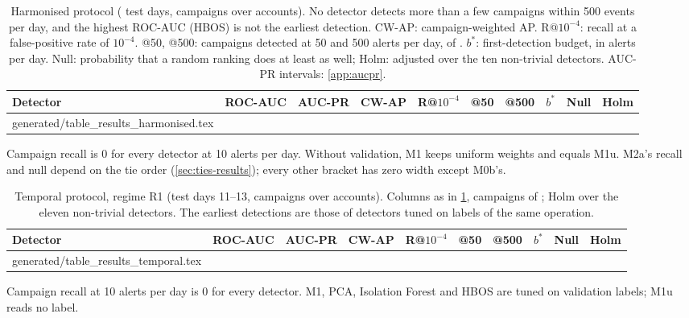 \documentclass[11pt,a4paper]{article}
\makeatletter
\newcommand{\tablerows}[1]{\@@input #1 }
\makeatother
\begin{document}
\begin{table}[t]
\centering
\scriptsize
\begin{threeparttable}
\caption{Harmonised protocol (\HarmTestDays{} test days, \HarmTestCampaigns{} campaigns over \HarmTestAccounts{} accounts). No detector detects more than a few campaigns within 500 events per day, and the highest ROC-AUC (HBOS) is not the earliest detection. CW-AP: campaign-weighted AP. R@$10^{-4}$: recall at a false-positive rate of $10^{-4}$. @50, @500: campaigns detected at 50 and 500 alerts per day, of \HarmTestCampaigns{}. $b^{*}$: first-detection budget, in alerts per day. Null: probability that a random ranking does at least as well; Holm: adjusted over the ten non-trivial detectors. AUC-PR intervals: \cref{app:aucpr}.}
\label{tab:results-harmonised}
\setlength{\tabcolsep}{3pt}
\begin{tabular}{@{}lrlllrrrrr@{}}
\toprule
Detector & ROC-AUC & AUC-PR & CW-AP & R@$10^{-4}$ & @50 & @500 & $b^{*}$ & Null & Holm \\
\midrule
\tablerows{generated/table_results_harmonised.tex}
\bottomrule
\end{tabular}
\begin{tablenotes}\footnotesize
\item Campaign recall is 0 for every detector at 10 alerts per day. Without validation, M1 keeps uniform weights and equals M1u. M2a's recall and null depend on the tie order (\cref{sec:ties-results}); every other bracket has zero width except M0b's.
\end{tablenotes}
\end{threeparttable}
\end{table}

\begin{table}[t]
\centering
\scriptsize
\begin{threeparttable}
\caption{Temporal protocol, regime R1 (test days 11--13, \TempTestCampaigns{} campaigns over \TempTestAccounts{} accounts). Columns as in \cref{tab:results-harmonised}, campaigns of \TempTestCampaigns{}; Holm over the eleven non-trivial detectors. The earliest detections are those of detectors tuned on labels of the same operation.}
\label{tab:results-temporal}
\setlength{\tabcolsep}{3pt}
\begin{tabular}{@{}lrlllrrrrr@{}}
\toprule
Detector & ROC-AUC & AUC-PR & CW-AP & R@$10^{-4}$ & @50 & @500 & $b^{*}$ & Null & Holm \\
\midrule
\tablerows{generated/table_results_temporal.tex}
\bottomrule
\end{tabular}
\begin{tablenotes}\footnotesize
\item Campaign recall at 10 alerts per day is 0 for every detector. M1, PCA, Isolation Forest and HBOS are tuned on validation labels; M1u reads no label.
\end{tablenotes}
\end{threeparttable}
\end{table}
\end{document}
